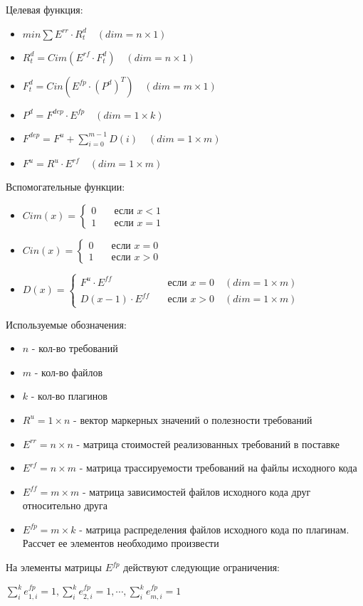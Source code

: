 \documentclass{article}
\begin{document}
  \thispagestyle{empty}
  
  Целевая функция:
  \begin{itemize}
    \item[] $\displaystyle min \sum E^{rr} \cdot R^{d}_{t} \quad (dim = n \times 1)$
    \item[] $R^{d}_{t} = Cim(E^{rf} \cdot F^{d}_{t}) \quad (dim = n \times 1)$
    \item[] $F^{d}_{t} = Cin(E^{fp} \cdot (P^{d})^{T}) \quad (dim = m \times 1)$
    \item[] $P^{d} = F^{dep} \cdot E^{fp} \quad (dim = 1 \times k)$
    \item[] $\displaystyle F^{dep} = F^{u} + \sum^{m - 1}_{i = 0}D(i) \quad (dim = 1 \times m)$
    \item[] $F^{u} = R^{u} \cdot E^{rf} \quad (dim = 1 \times m)$
  \end{itemize}

  Вспомогательные функции:
  \begin{itemize}
    \item[] $
    Cim(x) = 
      \begin{cases}
        0 & \quad \text{если } x < 1 \\
        1 & \quad \text{если } x = 1
      \end{cases}
    $
    \item[] $
      Cin(x) =
      \begin{cases}
        0 & \quad \text{если } x = 0 \\
        1 & \quad \text{если } x > 0
      \end{cases}
    $
    \item[] $
      D(x) =
      \begin{cases}
        F^{u} \cdot E^{ff}  & \quad \text{если } x = 0 \quad (dim = 1 \times m)\\
        D(x - 1) \cdot E^{ff} & \quad \text{если } x > 0 \quad (dim = 1 \times m)
      \end{cases}
    $
  \end{itemize}
  
  Используемые обозначения:
  \begin{itemize}
    \item[] $n$ - кол-во требований
    \item[] $m$ - кол-во файлов
    \item[] $k$ - кол-во плагинов
    \item[] $R^{u} = 1 \times n$ - вектор маркерных значений о полезности требований
    \item[] $E^{rr} = n \times n$ - матрица стоимостей реализованных требований в поставке
    \item[] $E^{rf} = n \times m$ - матрица трассируемости требований на файлы исходного кода
    \item[] $E^{ff} = m \times m$ - матрица зависимостей файлов исходного кода друг относительно друга
    \item[] $E^{fp} = m \times k$ - матрица распределения файлов исходного кода по плагинам. Рассчет ее элементов необходимо произвести
  \end{itemize}
  
  На элементы матрицы $E^{fp}$ действуют следующие ограничения:
  \begin{center}
    $\displaystyle \sum^{k}_{i}e^{fp}_{1, i} = 1, \sum^{k}_{i}e^{fp}_{2, i} = 1, \cdots, \sum^{k}_{i}e^{fp}_{m, i} = 1$
  \end{center}
\end{document}
